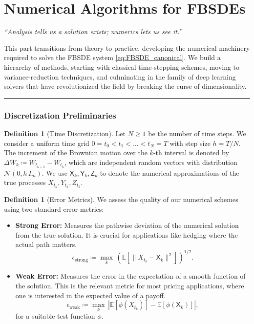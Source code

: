 \documentclass[11pt,letterpaper,oneside]{article}
\theoremstyle{plain}
\theoremstyle{definition}
\newtheorem{definition}[theorem]{Definition}
\theoremstyle{remark}
\begin{document}
\clearpage
\newpage
\part{Numerical Algorithms for FBSDEs}
\label{part:numerics}

\begin{center}
\textit{“Analysis tells us a solution exists; numerics lets us see it.”}
\end{center}

This part transitions from theory to practice, developing the numerical machinery required to solve the FBSDE system \eqref{eq:FBSDE_canonical}. We build a hierarchy of methods, starting with classical time-stepping schemes, moving to variance-reduction techniques, and culminating in the family of deep learning solvers that have revolutionized the field by breaking the curse of dimensionality.

\bigskip
\hrule
\bigskip

\section{Discretization Preliminaries}
\label{sec:discrete_notation}

\begin{definition}[Time Discretization]
Let \(N \ge 1\) be the number of time steps. We consider a uniform time grid \(0=t_0<t_1<\dots<t_N=T\) with step size \(h = T/N\). The increment of the Brownian motion over the \(k\)-th interval is denoted by \(\Delta W_k \coloneqq W_{t_{k+1}}-W_{t_k}\), which are independent random vectors with distribution \(\mathcal N(0,h\,I_m)\). We use \(\mathsf{X}_k, \mathsf{Y}_k, \mathsf{Z}_k\) to denote the numerical approximations of the true processes \(X_{t_k}, Y_{t_k}, Z_{t_k}\).
\end{definition}

\begin{definition}[Error Metrics]
We assess the quality of our numerical schemes using two standard error metrics:
\begin{itemize}
    \item \textbf{Strong Error:} Measures the pathwise deviation of the numerical solution from the true solution. It is crucial for applications like hedging where the actual path matters.
    \[
      \epsilon_{\mathrm{strong}} \coloneqq \max_{k}\, \left( \mathbb{E}\left[ \|X_{t_k}-\mathsf{X}_k\|^2 \right] \right)^{1/2}.
    \]
    \item \textbf{Weak Error:} Measures the error in the expectation of a smooth function of the solution. This is the relevant metric for most pricing applications, where one is interested in the expected value of a payoff.
    \[
      \epsilon_{\mathrm{weak}} \coloneqq \max_{k}\, \left| \mathbb{E}\left[\phi(X_{t_k})\right] - \mathbb{E}\left[\phi(\mathsf{X}_k)\right] \right|,
    \]
    for a suitable test function \(\phi\).
\end{itemize}
\end{definition}
\end{document}
